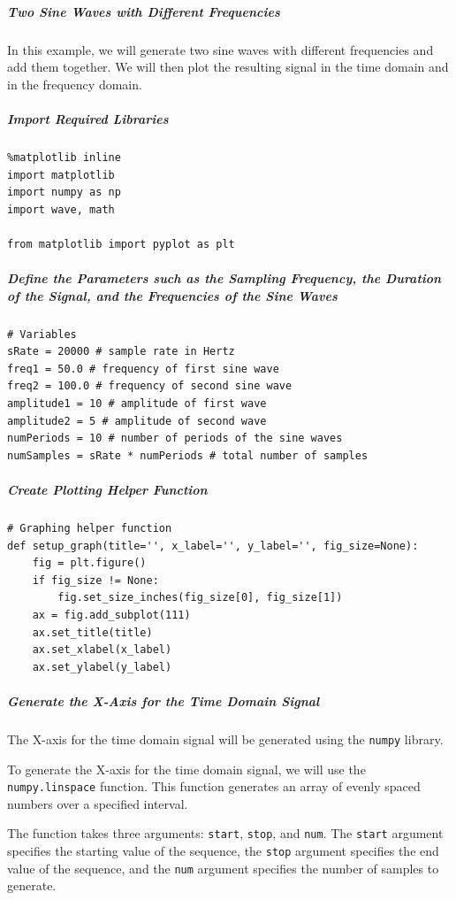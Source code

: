 \subparagraph{Two Sine Waves with Different Frequencies}

In this example, we will generate two sine waves with different frequencies and add them together. We will then plot the resulting signal in the time domain and in the frequency domain.

\subparagraph{Import Required Libraries}

\begin{verbatim}
%matplotlib inline
import matplotlib
import numpy as np
import wave, math

from matplotlib import pyplot as plt
\end{verbatim}

\subparagraph{Define the Parameters such as the Sampling Frequency, the Duration of the Signal, and the Frequencies of the Sine Waves}

\begin{verbatim}
# Variables
sRate = 20000 # sample rate in Hertz
freq1 = 50.0 # frequency of first sine wave
freq2 = 100.0 # frequency of second sine wave
amplitude1 = 10 # amplitude of first wave
amplitude2 = 5 # amplitude of second wave
numPeriods = 10 # number of periods of the sine waves
numSamples = sRate * numPeriods # total number of samples
\end{verbatim}

\subparagraph{Create Plotting Helper Function}

\begin{verbatim}
# Graphing helper function
def setup_graph(title='', x_label='', y_label='', fig_size=None):
    fig = plt.figure()
    if fig_size != None:
        fig.set_size_inches(fig_size[0], fig_size[1])
    ax = fig.add_subplot(111)
    ax.set_title(title)
    ax.set_xlabel(x_label)
    ax.set_ylabel(y_label)
\end{verbatim}

\subparagraph{Generate the X-Axis for the Time Domain Signal}

The X-axis for the time domain signal will be generated using the \texttt{numpy} library.

To generate the X-axis for the time domain signal, we will use the \texttt{numpy.linspace} function. This function generates an array of evenly spaced numbers over a specified interval.

The function takes three arguments: \texttt{start}, \texttt{stop}, and \texttt{num}. The \texttt{start} argument specifies the starting value of the sequence, the \texttt{stop} argument specifies the end value of the sequence, and the \texttt{num} argument specifies the number of samples to generate.

